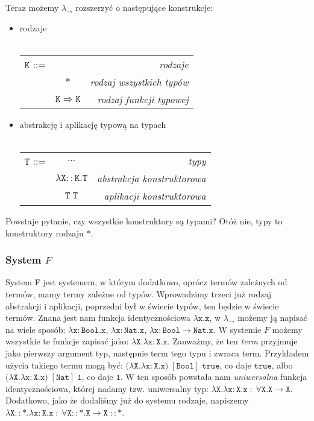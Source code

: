 \documentclass[11pt,leqno]{article}
\begin{document}
Teraz możemy $\lambda_{\rightarrow}$ rozszerzyć o następujące konstrukcje: 
\begin{itemize}
    \item rodzaje \\ \\
\begin{tabular}{| l c r |}
  \hline
  $\mathtt{K}$ ::= &  & \textit{rodzaje}  \\
   & $\mathtt{\ast}$ & \textit{rodzaj wszystkich typów} \\
   & $\mathtt{K \Rightarrow K}$ & \textit{rodzaj funkcji typowej} \\
  \hline
\end{tabular}
    \item abstrakcję i aplikację typową na typach \\ \\
\begin{tabular}{| l c r |}
   \hline
   $\mathtt{T}$ ::= & $\dots$ & \textit{typy}  \\
   & $\mathtt{\lambda X::K.T}$ & \textit{abstrakcja konstruktorowa} \\
   & $\mathtt{T\;T}$ & \textit{aplikacji konstruktorowa} \\
   \hline
\end{tabular}
\end{itemize} 

Powstaje pytanie, czy wszystkie konstruktory są typami? Otóż nie, typy to konstruktory rodzaju $\mathtt{\ast}$.

\subsubsection{System $F$}

System F jest systemem, w którym dodatkowo, oprócz termów zależnych od termów, mamy termy zależne od typów. Wprowadzimy trzeci już rodzaj abstrakcji i aplikacji, poprzedni był w świecie typów, ten będzie w świecie termów. Znana jest nam funkcja identycznościowa $\mathtt{\lambda x.x}$, w $\lambda_{\rightarrow}$ możemy ją napisać na wiele sposób: $\mathtt{\lambda x:Bool.x}$, $\mathtt{\lambda x:Nat.x}$, $\mathtt{\lambda x:Bool \rightarrow Nat.x}$. W systemie $F$ możemy wszystkie te funkcje zapisać jako: $\mathtt{\lambda X. \lambda x:X.x}$. Zauważmy, że ten \textit{term} przyjmuje jako pierwszy argument typ, następnie term tego typu i zwraca term. Przykładem użycia takiego termu mogą być: $(\mathtt{\lambda X. \lambda x:X.x)\;[Bool]\;true}$, co daje $\mathtt{true}$, albo $(\mathtt{\lambda X. \lambda x:X.x)\;[Nat]\;1}$, co daje $\mathtt{1}$. W ten sposób powstała nam \textit{uniwersalna} funkcja identycznościowa, której nadamy tzw. uniwersalny typ: $\mathtt{\lambda X. \lambda x:X.x \; : \; \forall X.X \rightarrow X}$. Dodatkowo, jako że dodaliśmy już do systemu rodzaje, napiszemy $\mathtt{\lambda X::\ast. \lambda x:X.x \; : \; \forall X::\ast.X \rightarrow X \; ::\ast}$. 
\end{document}
